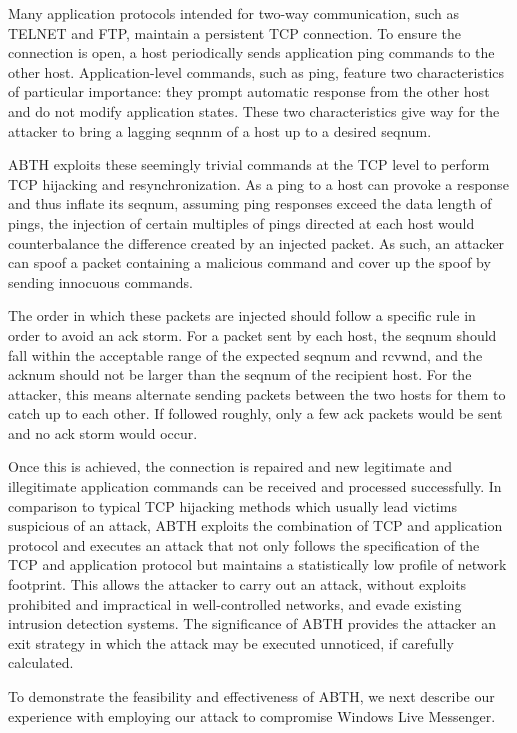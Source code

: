 \documentclass{sig-alternate}
\begin{document}
Many application protocols intended for two-way communication, such as TELNET and FTP, maintain a persistent TCP connection.
To ensure the connection is open, a host periodically sends application ping commands to the other host.
Application-level commands, such as ping, feature two characteristics of particular importance: they prompt automatic response from the other host and do not modify application states.
These two characteristics give way for the attacker to bring a lagging seqnnm of a host up to a desired seqnum. 

ABTH exploits these seemingly trivial commands at the TCP level to perform TCP hijacking and resynchronization.
As a ping to a host can provoke a response and thus inflate its seqnum, assuming ping responses exceed the data length of pings, the injection of certain multiples of pings directed at each host would counterbalance the difference created by an injected packet.
As such, an attacker can spoof a packet containing a malicious command and cover up the spoof by sending innocuous commands.

The order in which these packets are injected should follow a specific rule in order to avoid an ack storm.
For a packet sent by each host, the seqnum should fall within the acceptable range of the expected seqnum and rcvwnd, and the acknum should not be larger than the seqnum of the recipient host.
For the attacker, this means alternate sending packets between the two hosts for them to catch up to each other.
If followed roughly, only a few ack packets would be sent and no ack storm would occur.

Once this is achieved, the connection is repaired and new legitimate and illegitimate application commands can be received and processed successfully.
In comparison to typical TCP hijacking methods which usually lead victims suspicious of an attack, ABTH exploits the combination of TCP and application protocol and executes an attack that not only follows the specification of the TCP and application protocol but maintains a statistically low profile of network footprint.
This allows the attacker to carry out an attack, without exploits prohibited and impractical in well-controlled networks, and evade existing intrusion detection systems.
The significance of ABTH provides the attacker an exit strategy in which the attack may be executed unnoticed, if carefully calculated.

To demonstrate the feasibility and effectiveness of ABTH, we next describe our experience with employing our attack to compromise Windows Live Messenger.
\end{document}
